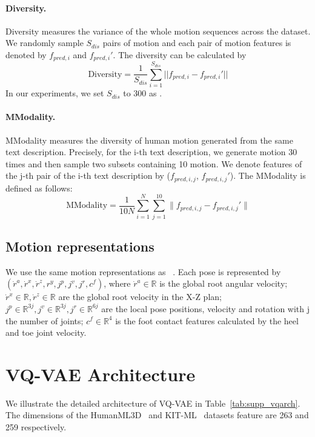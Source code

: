 \documentclass[10pt,twocolumn,letterpaper]{article}
\begin{document}
\paragraph{Diversity.} Diversity measures the variance of the whole motion sequences across the dataset. We randomly sample $S_{dis}$ pairs of motion and each pair of motion features is denoted by $f_{pred,i}$ and $f_{pred,i}'$. The diversity can be calculated by
\begin{equation}
\text{Diversity} = \frac{1}{S_{dis}}\sum_{i=1}^{S_{dis}}||f_{pred,i} - f_{pred,i}'||
\label{formula:diversity}
\end{equation}
In our experiments, we set $S_{dis}$ to 300 as \cite{guo2022generating}.


\paragraph{MModality.} MModality measures the diversity of human motion generated from the same text description. Precisely, for the i-th text description, we generate motion 30 times and then sample two subsets containing 10 motion. We denote features of the j-th pair of the i-th text description by ($f_{pred,i,j}$, $f_{pred,i,j}'$). The MModality is defined as follows:
\begin{equation}
\text{MModality} = \frac{1}{10N}\sum_{i=1}^{N}\sum_{j=1}^{10}\lVert f_{pred,i,j} - f_{pred,i,j}'\rVert
\label{formula:mmodality}
\end{equation}


\subsection{Motion representations}

We use the same motion representations as ~\cite{guo2022generating}. Each pose is represented by $(\dot{r}^a, \dot{r}^x, \dot{r}^z, r^y, j^p, j^v, j^r, c^f)$, where $\dot{r}^a \in \mathbb{R}$ is the global root angular velocity; $\dot{r}^x \in \mathbb{R}, \dot{r}^z \in \mathbb{R}$ are the global root velocity in the X-Z plan; $j^p \in \mathbb{R}^{3j}, j^v \in \mathbb{R}^{3j}, j^r \in \mathbb{R}^{6j}$ are the local pose positions, velocity and rotation with j the number of joints; $c^f\in \mathbb{R}^4$ is the foot contact features calculated by the heel and toe joint velocity.



\section{VQ-VAE Architecture}
\label{sec:supp_vq_arch}
We illustrate the detailed architecture of VQ-VAE in Table~\ref{tab:supp_vqarch}. The dimensions of the HumanML3D~\cite{guo2022generating} and KIT-ML~\cite{plappert2016kit} datasets feature are 263 and 259 respectively.
\end{document}
